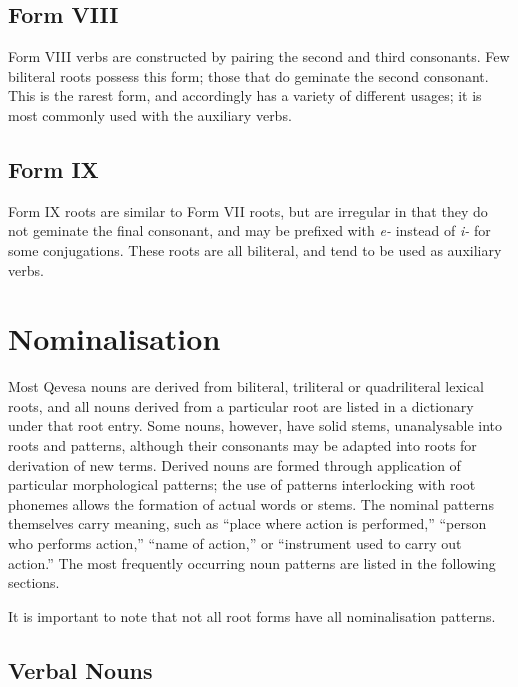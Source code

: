 \documentclass[grammar]{subfiles}
\begin{document}
	\subsection{Form VIII}
	\label{sec:dev_verb_form_viii}

	Form VIII verbs are constructed by pairing the second and third consonants. Few biliteral roots possess this form; those that do geminate the second consonant. This is the rarest form, and accordingly has a variety of different usages; it is most commonly used with the auxiliary verbs.

	\subsection{Form IX}
	\label{sec:dev_verb_form_ix}

	Form IX roots are similar to Form VII roots, but are irregular in that they do not geminate the final consonant, and may be prefixed with \emph{e-} instead of \emph{i-} for some conjugations. These roots are all biliteral, and tend to be used as auxiliary verbs.

	\section{Nominalisation}
	\label{sec:dev_nominalisation}

	Most Qevesa nouns are derived from biliteral, triliteral or quadriliteral lexical roots, and all nouns derived from a particular root are listed in a dictionary under that root entry. Some nouns, however, have solid stems, unanalysable into roots and patterns, although their consonants may be adapted into roots for derivation of new terms. Derived nouns are formed through application of particular morphological patterns; the use of patterns interlocking with root phonemes allows the formation of actual words or stems. The nominal patterns themselves carry meaning, such as “place where action is performed,” “person who performs action,” “name of action,” or “instrument used to carry out action.” The most frequently occurring noun patterns are listed in the following sections.

	It is important to note that not all root forms have all nominalisation patterns.

	\subsection{Verbal Nouns}
	\label{ssec:dev_verbal_nouns}
\end{document}
